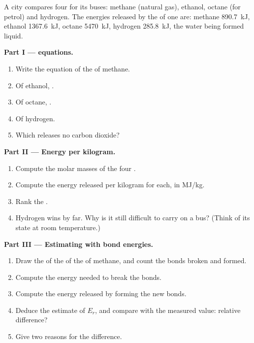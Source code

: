 \begin{problem}
\label{pb:g11:reaction-energy:1}
A city compares four  for its buses: methane (natural gas), ethanol,
octane (for petrol) and hydrogen. The energies released by the  of one  are: methane \qty{890.7}{kJ}, ethanol
\qty{1367.6}{kJ}, octane \qty{5470}{kJ}, hydrogen \qty{285.8}{kJ}, the
water being formed liquid.

\medskip
\noindent\textbf{Part I ---  equations.}
\begin{enumerate}
  \item Write the equation of the  of methane.
  \item Of ethanol, .
  \item Of octane, .
  \item Of hydrogen.
  \item Which  releases no carbon dioxide?
\end{enumerate}

\medskip
\noindent\textbf{Part II --- Energy per kilogram.}
\begin{enumerate}[resume]
  \item Compute the molar masses of the four .
  \item Compute the energy released per kilogram for each, in
        \si{MJ/kg}.
  \item Rank the .
  \item Hydrogen wins by far. Why is it still difficult to carry on a
        bus? (Think of its state at room temperature.)
\end{enumerate}

\medskip
\noindent\textbf{Part III --- Estimating with bond energies.}
\begin{enumerate}[resume]
  \item Draw the  of the  of the  of
        methane, and count the bonds broken and formed.
  \item Compute the energy needed to break the bonds.
  \item Compute the energy released by forming the new bonds.
  \item Deduce the estimate of $E_r$, and compare with the measured
        value: relative difference?
  \item Give two reasons for the difference.
\end{enumerate}


\end{problem}
